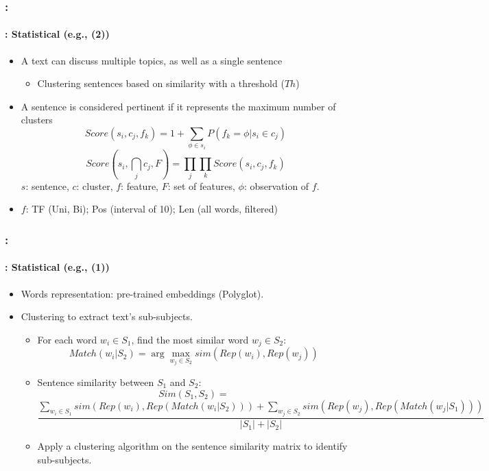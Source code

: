 \documentclass[xcolor=table]{beamer}
\begin{document}
\begin{frame}
	\frametitle{\insertshortsubtitle: \insertsection}
	\framesubtitle{\insertsubsection: Statistical (e.g., \cite{13-aries-al} (2))}
	
	\begin{itemize}
		\item A text can discuss multiple topics, as well as a single sentence
		\begin{itemize}
			\item Clustering sentences based on similarity with a threshold ($Th$)
		\end{itemize}
		\item A sentence is considered pertinent if it represents the maximum number of clusters
		\[ Score(s_i , c_j , f_k ) = 1 + \sum_{\phi \in s_i} {P(f_k=\phi | s_i \in c_j)} \]
		\[ Score(s_i , \bigcap_{j} c_j , F) =  %
		\prod_{j} \prod_{k} Score(s_i , c_j , f_k ) \]
		$ s $: sentence, $ c $: cluster, $ f $: feature, $ F $: set of features, $ \phi $: observation of $ f $.
		\item $f$: TF (Uni, Bi); Pos (interval of 10); Len (all words, filtered)
	\end{itemize}
	
\end{frame}

\begin{frame}
	\frametitle{\insertshortsubtitle: \insertsection}
	\framesubtitle{\insertsubsection: Statistical (e.g., \cite{15-oufaida-al} (1))}
	
	\begin{itemize}
		\item Words representation: pre-trained embeddings (Polyglot).
		\item Clustering to extract text's sub-subjects.
		\begin{itemize}
			\item For each word $w_i \in S_1$, find the most similar word $w_j \in S_2$:
			\[
			Match(w_i | S_2) = \arg\max_{w_j \in S_2} sim(Rep(w_i), Rep(w_j))
			\]
			\item Sentence similarity between $S_1$ and $S_2$:
			{\scriptsize
			\[
			Sim(S_1, S_2) = 
			\]
			\[
			\frac{\sum_{w_i \in S_1} sim(Rep(w_i), Rep(Match(w_i|S_2))) + \sum_{w_j \in S_2} sim(Rep(w_j), Rep(Match(w_j|S_1)))}{|S_1| + |S_2|}
			\]
			}
			\item Apply a clustering algorithm on the sentence similarity matrix to identify sub-subjects.
		\end{itemize}
	\end{itemize}
	
\end{frame}
\end{document}
